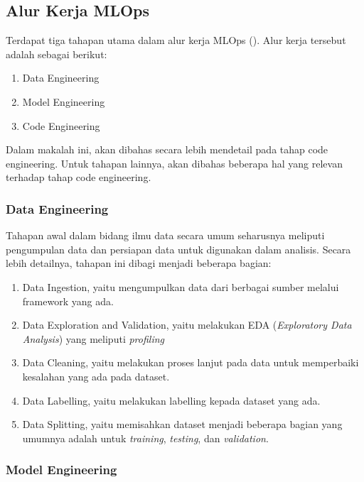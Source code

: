 \subsection{Alur Kerja MLOps}

Terdapat tiga tahapan utama dalam alur kerja MLOps (\cite{mlopsorg}).
Alur kerja tersebut adalah sebagai berikut:
\begin{enumerate}
  \item Data Engineering
  \item Model Engineering
  \item Code Engineering
\end{enumerate}

Dalam makalah ini, akan dibahas secara lebih mendetail pada tahap code engineering.
Untuk tahapan lainnya, akan dibahas beberapa hal yang relevan terhadap tahap code engineering.

\subsubsection{Data Engineering}

Tahapan awal dalam bidang ilmu data secara umum seharusnya meliputi pengumpulan data dan persiapan data untuk digunakan dalam analisis.
Secara lebih detailnya, tahapan ini dibagi menjadi beberapa bagian:
\begin{enumerate}
  \item Data Ingestion, yaitu mengumpulkan data dari berbagai sumber melalui framework yang ada. 
  \item Data Exploration and Validation, yaitu melakukan EDA (\textit{Exploratory Data Analysis}) yang meliputi \textit{profiling}
  \item Data Cleaning, yaitu melakukan proses lanjut pada data untuk memperbaiki kesalahan yang ada pada dataset.
  \item Data Labelling, yaitu melakukan labelling kepada dataset yang ada.
  \item Data Splitting, yaitu memisahkan dataset menjadi beberapa bagian yang umumnya adalah untuk \textit{training}, \textit{testing}, dan \textit{validation}.
\end{enumerate}

\subsubsection{Model Engineering}

